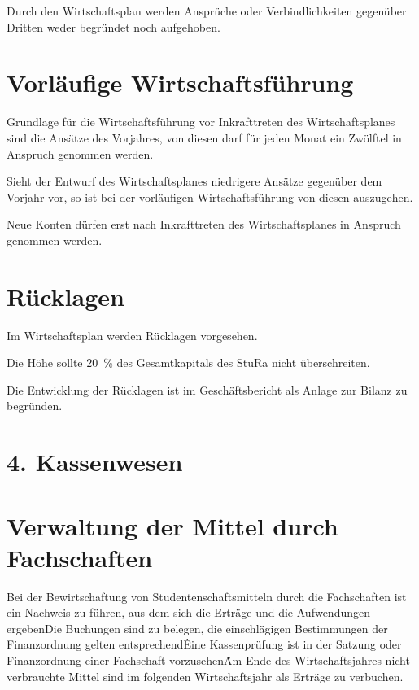 {\begin{multicols}{2}
\Abs \Satz Durch den Wirtschaftsplan werden Ansprüche oder Verbindlichkeiten gegenüber Dritten weder begründet noch aufgehoben.



\section{Vorläufige Wirtschaftsführung}

\Abs \Satz Grundlage für die Wirtschaftsführung vor Inkrafttreten des Wirtschaftsplanes sind die Ansätze des Vorjahres, von diesen darf für jeden Monat ein Zwölftel in Anspruch genommen werden.

\Abs \Satz Sieht der Entwurf des Wirtschaftsplanes niedrigere Ansätze gegenüber dem Vorjahr vor, so ist bei der vorläufigen Wirtschaftsführung von diesen auszugehen.

\Abs \Satz Neue Konten dürfen erst nach Inkrafttreten des Wirtschaftsplanes in Anspruch genommen werden.



\section{Rücklagen}

\Abs \Satz Im Wirtschaftsplan werden Rücklagen vorgesehen.

\Abs \Satz Die Höhe sollte 20~\% des Gesamtkapitals des StuRa nicht überschreiten.

\Abs \Satz Die Entwicklung der Rücklagen ist im Geschäftsbericht als Anlage zur Bilanz zu begründen.


\section*{4. Kassenwesen}



\section{Verwaltung der Mittel durch Fachschaften}

\Abs \Satz Bei der Bewirtschaftung von Studentenschaftsmitteln durch die Fachschaften ist ein Nachweis zu führen, aus dem sich die Erträge und die Aufwendungen ergeben\. Die Buchungen sind zu belegen, die einschlägigen Bestimmungen der Finanzordnung gelten entsprechend\. Eine Kassenprüfung ist in der Satzung oder Finanzordnung einer Fachschaft vorzusehen\. Am Ende des Wirtschaftsjahres nicht verbrauchte Mittel sind im folgenden Wirtschaftsjahr als Erträge zu verbuchen.


\end{multicols}}
